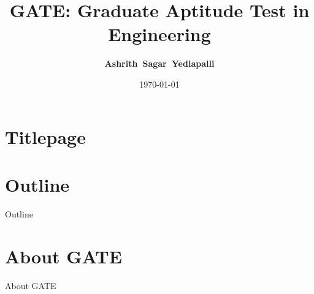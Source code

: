 \documentclass{beamer}
\title[GATE]{\textbf{GATE}: Graduate Aptitude Test in Engineering}
\author[Ashrith]{\textbf{Ashrith~Sagar~Yedlapalli}}
\institute[MIT]{Manipal Institute of Technology, Manipal}
\date{\today}
\begin{document}
\section*{Titlepage}
\begin{frame}
    \titlepage
\end{frame}

\section*{Outline}
\begin{frame}{Outline}
    \tableofcontents
\end{frame}

\section{About GATE}
\begin{frame}{About GATE}
\end{frame}
\end{document}

